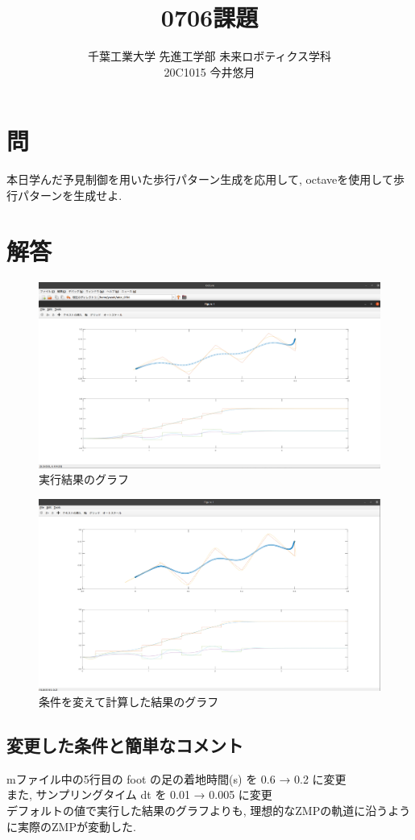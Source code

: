 \documentclass{jsarticle}
\begin{document}
\title{{\vspace*{-10mm}}{\LARGE 0706課題}}
\author{\large 千葉工業大学 先進工学部 未来ロボティクス学科 \vspace*{4mm}\\20C1015 今井悠月}
\date{}
\maketitle\vspace*{10mm}
\vspace*{-10mm}

\section*{問}
本日学んだ予見制御を用いた歩行パターン生成を応用して, octaveを使用して歩行パターンを生成せよ.

\section*{解答}

\begin{figure}[H]
  \centering
   \includegraphics[scale=0.27]{./fig/1.png}
   \caption{実行結果のグラフ}
\end{figure}

\begin{figure}[H]
  \centering
   \includegraphics[scale=0.27]{./fig/2.png}
   \caption{条件を変えて計算した結果のグラフ}
\end{figure}

\subsection*{変更した条件と簡単なコメント}
mファイル中の5行目の foot の足の着地時間(s) を 0.6 → 0.2 に変更\\
\hspace*{1zw}また, サンプリングタイム dt を 0.01 → 0.005 に変更\\
\hspace*{1zw}デフォルトの値で実行した結果のグラフよりも, 理想的なZMPの軌道に沿うように実際のZMPが変動した.
\end{document}
